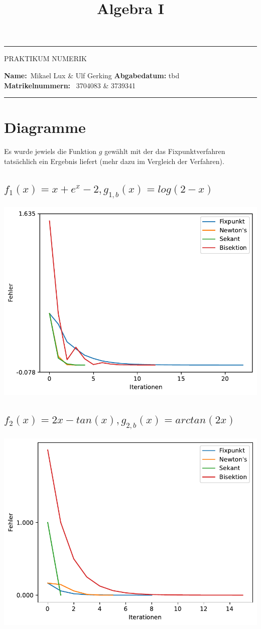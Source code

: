 \documentclass[10pt]{scrartcl}
\title{Algebra I}
\newcommand{\1}{1\hspace{-0,9ex}1}
\begin{document}
\begin{center}
	\hrule
	\vspace{.4cm}
	{\large PRAKTIKUM NUMERIK}
\end{center}
{\textbf{Name:}\ Mikael Lux \& Ulf Gerking\hspace{\fill} \textbf{Abgabedatum:} tbd}\\
{ \textbf{Matrikelnummern:}} \ 3704083  \& 3739341 \hspace{\fill} \\
	\hrule
	\section*{Diagramme}
	Es wurde jewiels die Funktion $g$ gewählt mit der das Fixpunktverfahren tatsächlich ein Ergebnis liefert (mehr dazu im Vergleich der Verfahren).
	\subsection*{$f_1(x) = x + e^x-2, g_{1,b}(x)=log(2-x)$}
	\includegraphics[width=\textwidth]{plots/plot.pdf}
	\subsection*{$f_2(x) = 2x - tan(x), g_{2,b}(x)=arctan(2x)$}
	\includegraphics[width=\textwidth]{plots/plot1.pdf}
\end{document}
